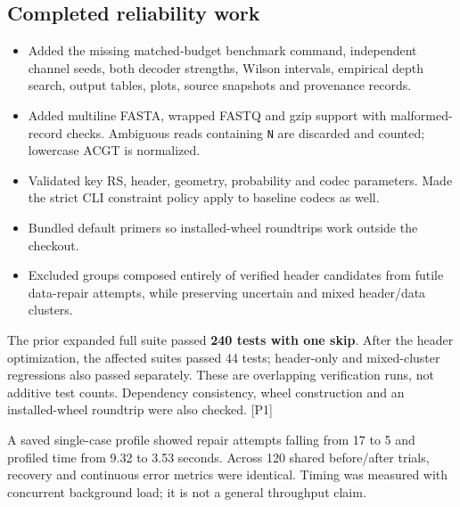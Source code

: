 \documentclass[11pt,a4paper]{article}
\begin{document}
\subsection*{Completed reliability work}
\begin{itemize}
\item Added the missing matched-budget benchmark command, independent channel seeds,
  both decoder strengths, Wilson intervals, empirical depth search, output tables,
  plots, source snapshots and provenance records.
\item Added multiline FASTA, wrapped FASTQ and gzip support with malformed-record checks.
  Ambiguous reads containing \texttt{N} are discarded and counted; lowercase ACGT is normalized.
\item Validated key RS, header, geometry, probability and codec parameters. Made the
  strict CLI constraint policy apply to baseline codecs as well.
\item Bundled default primers so installed-wheel roundtrips work outside the checkout.
\item Excluded groups composed entirely of verified header candidates from futile
  data-repair attempts, while preserving uncertain and mixed header/data clusters.
\end{itemize}
The prior expanded full suite passed \textbf{240 tests with one skip}. After the header
optimization, the affected suites passed 44 tests; header-only and mixed-cluster
regressions also passed separately. These are overlapping verification runs, not
additive test counts. Dependency consistency, wheel construction and an installed-wheel
roundtrip were also checked. [P1]

A saved single-case profile showed repair attempts falling from 17 to 5 and profiled
time from 9.32 to 3.53 seconds. Across 120 shared before/after trials, recovery and
continuous error metrics were identical. Timing was measured with concurrent background
load; it is not a general throughput claim.
\end{document}
